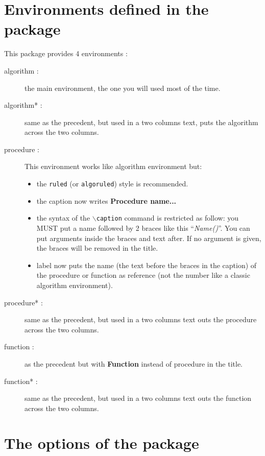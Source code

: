\documentclass[a4paper]{article}
\begin{document}
\section{Environments defined in the package\label{sec_envi}}

This package provides 4 environments :
\begin{description}
\item[algorithm :] the main environment, the one you will used most of the
  time. 
\item[algorithm* :] same as the precedent, but used in a two columns text, puts
  the algorithm across the two columns.
\item[procedure :] This environment works like algorithm environment but:
  \begin{itemize}
  \item the \texttt{ruled} (or \texttt{algoruled}) style is recommended.
  \item the caption now writes \textbf{Procedure name...}
  \item the syntax of the $\backslash$\texttt{caption} command is restricted as
    follow: you MUST put a name followed by 2 braces like this
    ``\emph{Name()}''.  You can put arguments inside the braces and text after.
    If no argument is given, the braces will be removed in the title.
  \item label now puts the name (the text before the braces in the caption) of
    the procedure or function as reference (not the number like a classic
    algorithm environment).
  \end{itemize}
\item[procedure* :] same as the precedent, but used in a two columns text outs the
  procedure across the two columns.
\item[function :] as the precedent but with \textbf{Function} instead of
  procedure in the title.
\item[function* :] same as the precedent, but used in a two columns text outs the
  function across the two columns.
\end{description}


\section{The options of the package\label{sec_options}}
\end{document}

